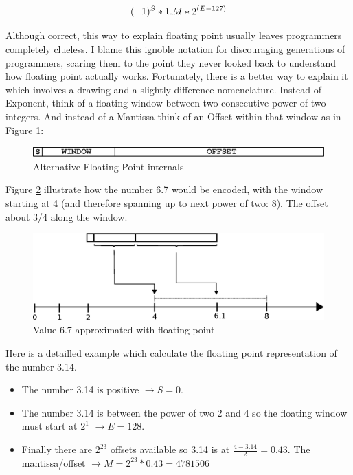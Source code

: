 \documentclass[book.tex]{subfiles}
\begin{document}
\begin{equation}\label{eq:fp}
\large
(-1)^S * 1.M * 2^{(E-127)}
\end{equation}
 
\bigskip  
Although correct, this way to explain floating point usually leaves programmers completely clueless. I blame this ignoble notation for discouraging generations of programmers, scaring them to the point they never looked back to understand how floating point actually works. Fortunately, there is a better way to explain it which involves a drawing and a slightly difference nomenclature. Instead of Exponent, think of a floating window between two consecutive power of two integers. And instead of a Mantissa think of an Offset within that window as in Figure \ref{fig:fp_internals}:
  
\begin{figure}[H]
\centering
\includegraphics[scale=0.4]{imgs/floating_point_intuitive.eps}
\caption{Alternative Floating Point internals}
\label{fig:fp_internals}
\end{figure}
  \bigskip  

Figure \ref{fig:fp_internals_window} illustrate how the number 6.7 would be encoded, with the window starting at 4 (and therefore spanning up to next power of two: 8). The offset about 3/4 along the window.

\begin{figure}[H]
\centering
\includegraphics[scale=0.7]{imgs/floating_point_window.eps}

\caption{Value 6.7 approximated with floating point}
\label{fig:fp_internals_window}
\end{figure}
  \bigskip
  
Here is a detailled example which calculate the floating point representation of the number 3.14.
\begin{itemize}
 \item The number 3.14 is positive  $\rightarrow S=0$.
 \item The number 3.14 is between the power of two 2 and 4 so the floating window must start at $2^1$  $\rightarrow E=128$.
 \item Finally there are $2^{23}$ offsets available so 3.14 is at $\frac{4-3.14}{2} = 0.43 $. The mantissa/offset $\rightarrow M = 2^{23}*0.43 = 4781506$
\end{itemize}
\end{document}
